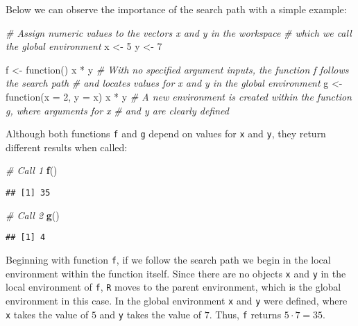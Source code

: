 \documentclass[11,]{article}
\newenvironment{Shaded}{\begin{snugshade}}{\end{snugshade}}
\newcommand{\KeywordTok}[1]{\textcolor[rgb]{0.13,0.29,0.53}{\textbf{{#1}}}}
\newcommand{\DataTypeTok}[1]{\textcolor[rgb]{0.13,0.29,0.53}{{#1}}}
\newcommand{\DecValTok}[1]{\textcolor[rgb]{0.00,0.00,0.81}{{#1}}}
\newcommand{\StringTok}[1]{\textcolor[rgb]{0.31,0.60,0.02}{{#1}}}
\newcommand{\CommentTok}[1]{\textcolor[rgb]{0.56,0.35,0.01}{\textit{{#1}}}}
\newcommand{\NormalTok}[1]{{#1}}
\begin{document}
Below we can observe the importance of the search path with a simple
example:

\begin{Shaded}
\begin{Highlighting}[]
\CommentTok{# Assign numeric values to the vectors x and y in the workspace }
\CommentTok{# which we call the global environment}
\NormalTok{x <-}\StringTok{ }\DecValTok{5}
\NormalTok{y <-}\StringTok{ }\DecValTok{7}

\NormalTok{f <-}\StringTok{ }\NormalTok{function() x *}\StringTok{ }\NormalTok{y}
  \CommentTok{# With no specified argument inputs, the function f follows the search path}
  \CommentTok{# and locates values for x and y in the global environment}
\NormalTok{g <-}\StringTok{ }\NormalTok{function(}\DataTypeTok{x =} \DecValTok{2}\NormalTok{, }\DataTypeTok{y =} \NormalTok{x) x *}\StringTok{ }\NormalTok{y}
  \CommentTok{# A new environment is created within the function g, where arguments for x}
  \CommentTok{# and y are clearly defined}
\end{Highlighting}
\end{Shaded}

Although both functions \texttt{f} and \texttt{g} depend on values for
\texttt{x} and \texttt{y}, they return different results when called:

\begin{Shaded}
\begin{Highlighting}[]
\CommentTok{# Call 1}
\KeywordTok{f}\NormalTok{()}
\end{Highlighting}
\end{Shaded}

\begin{verbatim}
## [1] 35
\end{verbatim}

\begin{Shaded}
\begin{Highlighting}[]
\CommentTok{# Call 2}
\KeywordTok{g}\NormalTok{()}
\end{Highlighting}
\end{Shaded}

\begin{verbatim}
## [1] 4
\end{verbatim}

Beginning with function \texttt{f}, if we follow the search path we
begin in the local environment within the function itself. Since there
are no objects \texttt{x} and \texttt{y} in the local environment of
\texttt{f}, \texttt{R} moves to the parent environment, which is the
global environment in this case. In the global environment \texttt{x}
and \texttt{y} were defined, where \texttt{x} takes the value of \(5\)
and \texttt{y} takes the value of \(7\). Thus, \texttt{f} returns
\(5 \cdot 7=35\).
\end{document}
